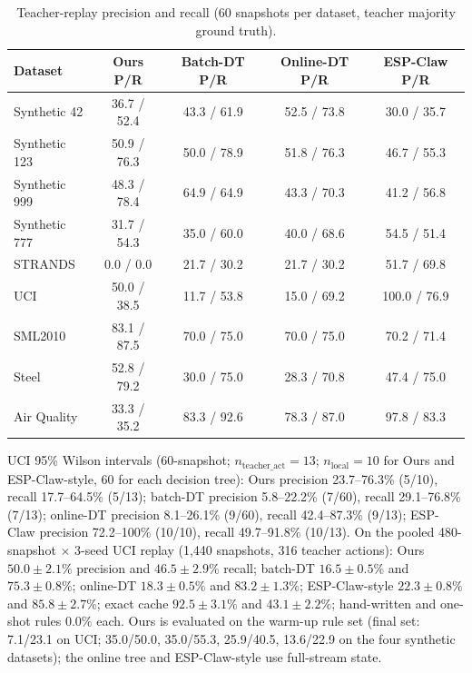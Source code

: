 \documentclass[review]{elsarticle}
\begin{document}
\begin{table}[t]
\centering
\caption{Teacher-replay precision and recall (60 snapshots per dataset,
teacher majority ground truth).}
\label{tab:pr}
\footnotesize
\begin{tabular}{lcccc}
\toprule
Dataset & Ours P/R & Batch-DT P/R & Online-DT P/R & ESP-Claw P/R \\
\midrule
Synthetic 42 & 36.7 / 52.4 & 43.3 / 61.9 & 52.5 / 73.8 & 30.0 / 35.7 \\
Synthetic 123 & 50.9 / 76.3 & 50.0 / 78.9 & 51.8 / 76.3 & 46.7 / 55.3 \\
Synthetic 999 & 48.3 / 78.4 & 64.9 / 64.9 & 43.3 / 70.3 & 41.2 / 56.8 \\
Synthetic 777 & 31.7 / 54.3 & 35.0 / 60.0 & 40.0 / 68.6 & 54.5 / 51.4 \\
STRANDS & 0.0 / 0.0 & 21.7 / 30.2 & 21.7 / 30.2 & 51.7 / 69.8 \\
UCI & 50.0 / 38.5 & 11.7 / 53.8 & 15.0 / 69.2 & 100.0 / 76.9 \\
SML2010 & 83.1 / 87.5 & 70.0 / 75.0 & 70.0 / 75.0 & 70.2 / 71.4 \\
Steel & 52.8 / 79.2 & 30.0 / 75.0 & 28.3 / 70.8 & 47.4 / 75.0 \\
Air Quality & 33.3 / 35.2 & 83.3 / 92.6 & 78.3 / 87.0 & 97.8 / 83.3 \\
\bottomrule
\end{tabular}
\end{table}

UCI 95\% Wilson intervals (60-snapshot; $n_\mathrm{teacher\_act} = 13$;
$n_\mathrm{local} = 10$ for Ours and ESP-Claw-style, $60$ for each decision
tree): Ours precision 23.7--76.3\% (5/10), recall 17.7--64.5\% (5/13);
batch-DT precision 5.8--22.2\% (7/60), recall 29.1--76.8\% (7/13); online-DT
precision 8.1--26.1\% (9/60), recall 42.4--87.3\% (9/13); ESP-Claw precision
72.2--100\% (10/10), recall 49.7--91.8\% (10/13). On the pooled
480-snapshot $\times$ 3-seed UCI replay (1,440 snapshots, 316 teacher
actions): Ours $50.0 \pm 2.1\%$ precision and $46.5 \pm 2.9\%$ recall;
batch-DT $16.5 \pm 0.5\%$ and $75.3 \pm 0.8\%$; online-DT $18.3 \pm 0.5\%$
and $83.2 \pm 1.3\%$; ESP-Claw-style $22.3 \pm 0.8\%$ and $85.8 \pm 2.7\%$;
exact cache $92.5 \pm 3.1\%$ and $43.1 \pm 2.2\%$; hand-written and one-shot
rules 0.0\% each. Ours is evaluated on the warm-up rule set (final set:
7.1/23.1 on UCI; 35.0/50.0, 35.0/55.3, 25.9/40.5, 13.6/22.9 on the four
synthetic datasets); the online tree and ESP-Claw-style use full-stream
state.
\end{document}
